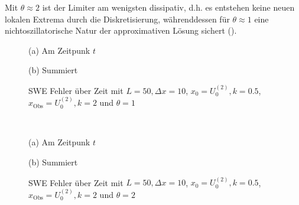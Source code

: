 Mit $\theta\approx 2$ ist der Limiter am wenigsten dissipativ, d.h. es entstehen keine neuen lokalen Extrema durch die Diskretisierung, währenddessen für $\theta\approx 1$ eine nichtoszillatorische Natur der approximativen Lösung sichert (\cite{kurganov2000new}).
\begin{figure}
\footnotesize
\begin{minipage}[b]{0.49\linewidth}
\centering

\caption*{(a) Am Zeitpunk $t$}
\end{minipage}
\begin{minipage}[b]{0.49\linewidth}
\centering

\caption*{(b) Summiert}
\end{minipage}
\caption{SWE Fehler über Zeit mit $L=50,\Delta x=10$, $x_0=U_0^{(2)},k=0.5$, $x_{\text{Obs}} = U_0^{(2)}, k=2$ und $\theta=1$}
\label{fig:sweConvergenceAdjoint}
% 
\quad\\[0.3cm]
\begin{minipage}[b]{0.49\linewidth}
\centering

\caption*{(a) Am Zeitpunk $t$}
\end{minipage}
\begin{minipage}[b]{0.49\linewidth}
\centering

\caption*{(b) Summiert}
\end{minipage}
\caption{SWE Fehler über Zeit mit $L=50,\Delta x=10$, $x_0=U_0^{(2)},k=0.5$, $x_{\text{Obs}} = U_0^{(2)}, k=2$ und $\theta=2$}
\label{fig:sweConvergenceAdjoint1}
\end{figure}





